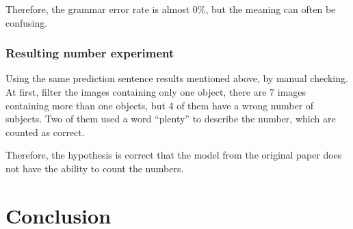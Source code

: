 \documentclass[10pt,twocolumn,letterpaper]{article}
\begin{document}
Therefore, the grammar error rate is almost 0\%, but the meaning can often be confusing.


\subsubsection{Resulting number experiment} \label{sec:rn}
Using the same prediction sentence results mentioned above, by manual checking.
At first, filter the images containing only one object, there are 7 images containing more than one objects,
but 4 of them have a wrong number of subjects. Two of them used a word ``plenty'' to describe the number, which are counted as correct.

Therefore, the hypothesis is correct that the model from the original paper does not have the ability to count the numbers.


\section{Conclusion}
\end{document}
